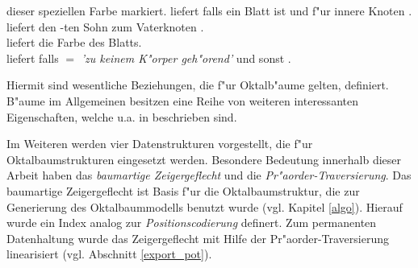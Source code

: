 \begin{itemize}
    dieser speziellen Farbe markiert.
    \oplistbeg
    \opitem {} liefert \true{} falls 
	 ein Blatt ist und f"ur innere Knoten \false.
    \opitem {}\\
	 liefert 
	den -ten Sohn zum Vaterknoten .
    \opitem {}\\
	 liefert die Farbe des Blatts.
    \opitem {}\\
	 liefert \true{} falls 
	 $=$ \emph{'zu keinem K"orper geh"orend'} und 
	sonst \false{}.
    \oplistend
\end{itemize}
Hiermit sind wesentliche Beziehungen, die f"ur Oktalb"aume gelten, definiert. 
B"aume im Allgemeinen besitzen eine Reihe von weiteren interessanten 
Eigenschaften, welche u.a. in \cite{algo_cpp} beschrieben sind.

Im Weiteren werden vier Datenstrukturen vorgestellt, die f"ur 
Oktalbaumstrukturen eingesetzt werden. Besondere Bedeutung innerhalb dieser 
Arbeit haben das \emph{baumartige Zeigergeflecht} und die 
\emph{Pr"aorder-Traversierung}. Das baumartige Zeigergeflecht ist Basis f"ur 
die Oktalbaumstruktur, die zur Generierung des Oktalbaummodells benutzt wurde
(vgl. Kapitel \ref{algo}). Hierauf wurde ein Index analog zur 
\emph{Positionscodierung} definert.
Zum permanenten Datenhaltung wurde das Zeigergeflecht mit Hilfe der 
Pr"aorder-Traversierung linearisiert (vgl. Abschnitt \ref{export_pot}).

